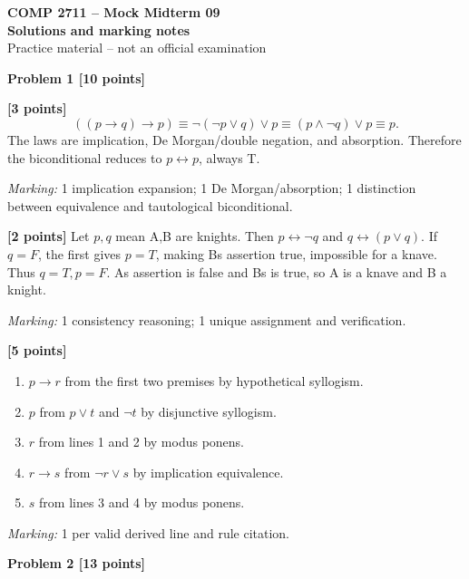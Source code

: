 \documentclass[12pt,letterpaper]{article}
\newcommand{\problemheading}[2][5\baselineskip]{\Needspace{#1}\par\noindent\hspace*{-0.625in}\textbf{#2}\par\nobreak\vspace{0.3em}}
\begin{document}
\begin{center}\textbf{COMP 2711 -- Mock Midterm 09}\\{\large\bfseries Solutions and marking notes}\\Practice material -- not an official examination\end{center}\vspace{0.5em}
\problemheading[\dimexpr 3\baselineskip+4\baselineskip\relax]{Problem 1 [10 points]}
\begin{description}[font=\normalfont,leftmargin=1.2em,labelsep=0.4em]
\item[(a)] \textbf{[3 points]} \[((p\to q)\to p)\equiv\neg(\neg p\lor q)\lor p\equiv(p\land\neg q)\lor p\equiv p.\] The laws are implication, De Morgan/double negation, and absorption. Therefore the biconditional reduces to $p\leftrightarrow p$, always T.
\par\textit{Marking:} 1 implication expansion; 1 De Morgan/absorption; 1 distinction between equivalence and tautological biconditional.
\item[(b)] \textbf{[2 points]} Let $p,q$ mean A,B are knights. Then $p\leftrightarrow\neg q$ and $q\leftrightarrow(p\lor q)$. If $q=F$, the first gives $p=T$, making B\textquotesingle s assertion true, impossible for a knave. Thus $q=T,p=F$. A\textquotesingle s assertion is false and B\textquotesingle s is true, so A is a knave and B a knight.
\par\textit{Marking:} 1 consistency reasoning; 1 unique assignment and verification.
\item[(c)] \textbf{[5 points]} \begin{enumerate}\item $p\to r$ from the first two premises by hypothetical syllogism.\item $p$ from $p\lor t$ and $\neg t$ by disjunctive syllogism.\item $r$ from lines 1 and 2 by modus ponens.\item $r\to s$ from $\neg r\lor s$ by implication equivalence.\item $s$ from lines 3 and 4 by modus ponens.\end{enumerate}
\par\textit{Marking:} 1 per valid derived line and rule citation.
\end{description}
\vspace{0.65em}
\problemheading[\dimexpr 3\baselineskip+4\baselineskip\relax]{Problem 2 [13 points]}
\end{document}
